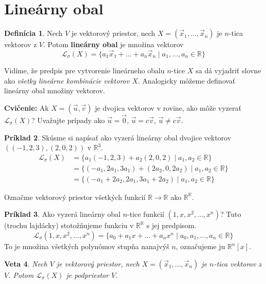 \documentclass[11pt,a4paper]{article}
\theoremstyle{definition}
\newtheorem{definicia}{Definícia}[section]
\newtheorem{priklad}[definicia]{Príklad}
\theoremstyle{plain}
\newtheorem{veta}[definicia]{Veta}
\theoremstyle{remark}
\newcommand{\R}{\mathbb{R}}
\newcommand{\Lo}{\mathcal{L}_\sigma} %
\begin{document}
\section*{Lineárny obal}

\begin{definicia} \label{def:10.1}
Nech $V$ je vektorový priestor, nech $X=(\vec{x}_{1},...,\vec{x}_{n})$ je $n$-tica vektorov z $V$. Potom \textbf{lineárny obal} je množina vektorov
$$ \Lo(X)=\{a_{1}\vec{x}_{1}+...+a_{n}\vec{x}_{n} \mid a_{1},...,a_{n}\in \R\} $$
\end{definicia}

Vidíme, že predpis pre vytvorenie lineárneho obalu $n$-tice $X$ sa dá vyjadriť slovne ako \textit{všetky lineárne kombinácie vektorov $X$}. Analogicky môžeme definovať lineárny obal množiny vektorov.

\textbf{Cvičenie:} Ak $X=(\vec{u}, \vec{v})$ je dvojica vektorov v rovine, ako môže vyzerať $\Lo(X)$? Uvažujte prípady ako $\vec{u}=\vec{0}$, $\vec{u}=c\vec{v}$, $\vec{u} \neq c\vec{v}$.


\begin{priklad}
Skúsme si napísať ako vyzerá lineárny obal dvojice vektorov $((-1,2,3), (2,0,2))$ v $\R^{3}$.
\begin{align*}
\Lo(X) &= \{a_{1}(-1,2,3)+a_{2}(2,0,2) \mid a_{1},a_{2}\in \R\} \\
&= \{(-a_{1},2a_{1},3a_{1})+(2a_{2},0,2a_{2}) \mid a_{1},a_{2}\in \R\} \\
&= \{(-a_{1}+2a_{2},2a_{1},3a_{1}+2a_{2}) \mid a_{1},a_{2}\in \R\}
\end{align*}
\end{priklad}

Označme vektorový priestor všetkých funkcií $\R \rightarrow \R$ ako $\R^\R$.

\begin{priklad}
Ako vyzerá lineárny obal $n$-tice funkcií $(1,x,x^{2},...,x^{n})$? 
Tuto (trochu lajdácky) stotožňujeme funkciu v $\R^\R$ s jej predpisom.
$$ \Lo(1,x,x^{2},...,x^{n}) = \{a_{0}+a_{1}x+...+a_{n}x^{n} \mid a_{0},a_{1},...,a_{n}\in \R\} $$
To je množina všetkých polynómov stupňa nanajvýš $n$, označujeme ju $\R^{n}[x]$.
\end{priklad}

\begin{veta} \label{veta:10.2}
Nech $V$ je vektorový priestor, nech $X=(\vec{x}_{1},...,\vec{x}_{n})$ je $n$-tica vektorov z $V$. Potom $\Lo(X)$ je podpriestor $V$.
\end{veta}
\end{document}
